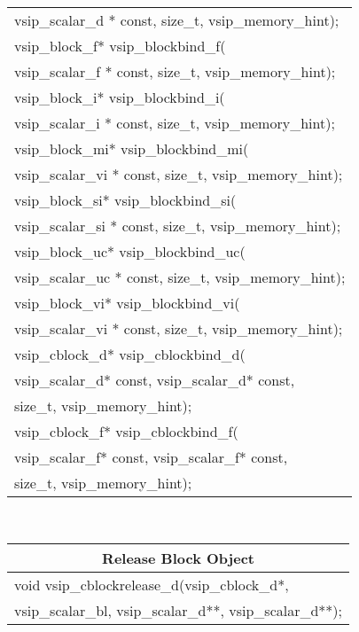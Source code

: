 {\begin{tabular}[H]{l}
vsip\_scalar\_d * const, size\_t, vsip\_memory\_hint);\\
vsip\_block\_f* vsip\_blockbind\_f(\\*\hspace{.7cm}vsip\_scalar\_f * const, size\_t, vsip\_memory\_hint);\\
vsip\_block\_i* vsip\_blockbind\_i(\\*\hspace{.7cm}vsip\_scalar\_i * const, size\_t, vsip\_memory\_hint);\\
vsip\_block\_mi* vsip\_blockbind\_mi(\\*\hspace{.7cm}vsip\_scalar\_vi * const, size\_t, vsip\_memory\_hint);\\
vsip\_block\_si* vsip\_blockbind\_si(\\*\hspace{.7cm}vsip\_scalar\_si * const, size\_t, vsip\_memory\_hint);\\
vsip\_block\_uc* vsip\_blockbind\_uc(\\*\hspace{.7cm}vsip\_scalar\_uc * const, size\_t, vsip\_memory\_hint);\\
vsip\_block\_vi* vsip\_blockbind\_vi(\\*\hspace{.7cm}vsip\_scalar\_vi * const, size\_t, vsip\_memory\_hint);\\
vsip\_cblock\_d* vsip\_cblockbind\_d(\\*\hspace{.7cm}vsip\_scalar\_d* const, vsip\_scalar\_d* const,\\*\hspace{.7cm}size\_t, vsip\_memory\_hint);\\
vsip\_cblock\_f* vsip\_cblockbind\_f(\\*\hspace{.7cm}vsip\_scalar\_f* const, vsip\_scalar\_f* const,\\*\hspace{.7cm}size\_t, vsip\_memory\_hint);\\
\end{tabular}\\
\begin{tabular}[H]{l}
\multicolumn{1}{c}{\rmfamily \bfseries Release Block Object\vspace{.1cm}}\\ \hline
void vsip\_cblockrelease\_d(vsip\_cblock\_d*,\\*\hspace{.7cm}vsip\_scalar\_bl, vsip\_scalar\_d**, vsip\_scalar\_d**);\\

\end{tabular}}
